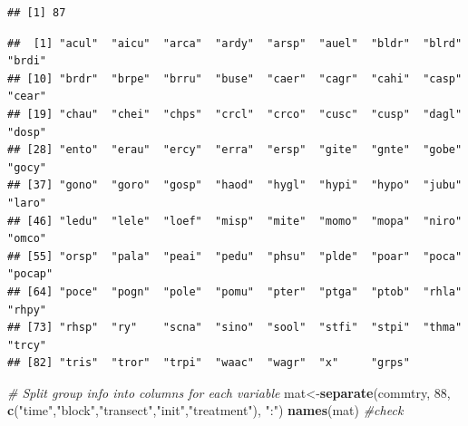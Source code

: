 \documentclass[
]{article}
\newenvironment{Shaded}{\begin{snugshade}}{\end{snugshade}}
\newcommand{\CommentTok}[1]{\textcolor[rgb]{0.56,0.35,0.01}{\textit{#1}}}
\newcommand{\ConstantTok}[1]{\textcolor[rgb]{0.56,0.35,0.01}{#1}}
\newcommand{\DecValTok}[1]{\textcolor[rgb]{0.00,0.00,0.81}{#1}}
\newcommand{\FunctionTok}[1]{\textcolor[rgb]{0.13,0.29,0.53}{\textbf{#1}}}
\newcommand{\NormalTok}[1]{#1}
\newcommand{\OtherTok}[1]{\textcolor[rgb]{0.56,0.35,0.01}{#1}}
\newcommand{\SpecialCharTok}[1]{\textcolor[rgb]{0.81,0.36,0.00}{\textbf{#1}}}
\newcommand{\StringTok}[1]{\textcolor[rgb]{0.31,0.60,0.02}{#1}}
\begin{document}
\begin{verbatim}
## [1] 87
\end{verbatim}

\begin{Shaded}
\end{Shaded}

\begin{verbatim}
##  [1] "acul"  "aicu"  "arca"  "ardy"  "arsp"  "auel"  "bldr"  "blrd"  "brdi" 
## [10] "brdr"  "brpe"  "brru"  "buse"  "caer"  "cagr"  "cahi"  "casp"  "cear" 
## [19] "chau"  "chei"  "chps"  "crcl"  "crco"  "cusc"  "cusp"  "dagl"  "dosp" 
## [28] "ento"  "erau"  "ercy"  "erra"  "ersp"  "gite"  "gnte"  "gobe"  "gocy" 
## [37] "gono"  "goro"  "gosp"  "haod"  "hygl"  "hypi"  "hypo"  "jubu"  "laro" 
## [46] "ledu"  "lele"  "loef"  "misp"  "mite"  "momo"  "mopa"  "niro"  "omco" 
## [55] "orsp"  "pala"  "peai"  "pedu"  "phsu"  "plde"  "poar"  "poca"  "pocap"
## [64] "poce"  "pogn"  "pole"  "pomu"  "pter"  "ptga"  "ptob"  "rhla"  "rhpy" 
## [73] "rhsp"  "ry"    "scna"  "sino"  "sool"  "stfi"  "stpi"  "thma"  "trcy" 
## [82] "tris"  "tror"  "trpi"  "waac"  "wagr"  "x"     "grps"
\end{verbatim}

\begin{Shaded}
\begin{Highlighting}[]
\CommentTok{\# Split group info into columns for each variable}
\NormalTok{mat}\OtherTok{\textless{}{-}}\FunctionTok{separate}\NormalTok{(commtry, }\DecValTok{88}\NormalTok{, }\FunctionTok{c}\NormalTok{(}\StringTok{"time"}\NormalTok{,}\StringTok{"block"}\NormalTok{,}\StringTok{"transect"}\NormalTok{,}\StringTok{"init"}\NormalTok{,}\StringTok{"treatment"}\NormalTok{), }\StringTok{":"}\NormalTok{)}
\FunctionTok{names}\NormalTok{(mat) }\CommentTok{\#check}
\end{Highlighting}
\end{Shaded}
\end{document}
